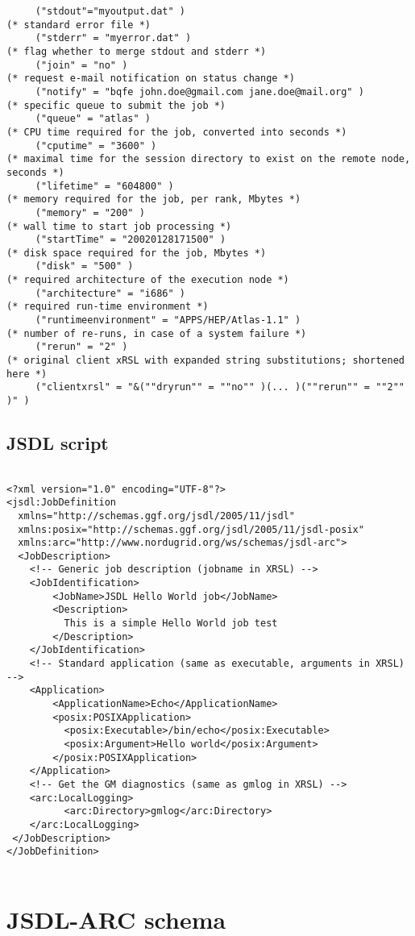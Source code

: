 \documentclass{book}
\begin{document}
\begin{verbatim}
     ("stdout"="myoutput.dat" )
(* standard error file *)
     ("stderr" = "myerror.dat" )
(* flag whether to merge stdout and stderr *)
     ("join" = "no" )
(* request e-mail notification on status change *)
     ("notify" = "bqfe john.doe@gmail.com jane.doe@mail.org" )
(* specific queue to submit the job *)
     ("queue" = "atlas" )
(* CPU time required for the job, converted into seconds *)
     ("cputime" = "3600" )
(* maximal time for the session directory to exist on the remote node, seconds *)
     ("lifetime" = "604800" )
(* memory required for the job, per rank, Mbytes *)
     ("memory" = "200" )
(* wall time to start job processing *)
     ("startTime" = "20020128171500" )
(* disk space required for the job, Mbytes *)
     ("disk" = "500" )
(* required architecture of the execution node *)
     ("architecture" = "i686" )
(* required run-time environment *)
     ("runtimeenvironment" = "APPS/HEP/Atlas-1.1" )
(* number of re-runs, in case of a system failure *)
     ("rerun" = "2" )
(* original client xRSL with expanded string substitutions; shortened here *)
     ("clientxrsl" = "&(""dryrun"" = ""no"" )(... )(""rerun"" = ""2"" )" )
  \end{verbatim}

  \section{JSDL script}

  \begin{verbatim}

<?xml version="1.0" encoding="UTF-8"?>
<jsdl:JobDefinition
  xmlns="http://schemas.ggf.org/jsdl/2005/11/jsdl"
  xmlns:posix="http://schemas.ggf.org/jsdl/2005/11/jsdl-posix"
  xmlns:arc="http://www.nordugrid.org/ws/schemas/jsdl-arc">
  <JobDescription>
    <!-- Generic job description (jobname in XRSL) -->
    <JobIdentification>
        <JobName>JSDL Hello World job</JobName>
        <Description>
          This is a simple Hello World job test
        </Description>
    </JobIdentification>
    <!-- Standard application (same as executable, arguments in XRSL) -->
    <Application>
        <ApplicationName>Echo</ApplicationName>
        <posix:POSIXApplication>
          <posix:Executable>/bin/echo</posix:Executable>
          <posix:Argument>Hello world</posix:Argument>
        </posix:POSIXApplication>
    </Application>
    <!-- Get the GM diagnostics (same as gmlog in XRSL) -->
    <arc:LocalLogging>
	      <arc:Directory>gmlog</arc:Directory>
    </arc:LocalLogging>
 </JobDescription>
</JobDefinition>


  \end{verbatim}


  \chapter{JSDL-ARC schema}
  \label{sec:jsdl-arc-schema}

  


  
  \printindex
\end{document}
